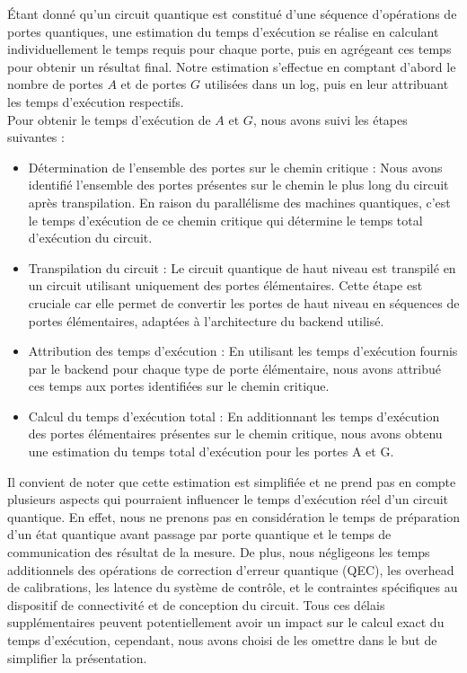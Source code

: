 Étant donné qu'un circuit quantique est constitué d'une séquence d'opérations de portes quantiques, une estimation du temps d'exécution se réalise en calculant individuellement le temps requis pour chaque porte, puis en agrégeant ces temps pour obtenir un résultat final.
Notre estimation s'effectue en comptant d'abord le nombre de portes $A$ et de portes $G$ utilisées dans un log, puis en leur attribuant les temps d'exécution respectifs.
\\
Pour obtenir le temps d'exécution de $A$ et $G$, nous avons suivi les étapes suivantes :
\begin{itemize}
    \item 
    Détermination de l'ensemble des portes sur le chemin critique : Nous avons identifié l'ensemble des portes présentes sur le chemin le plus long du circuit après transpilation. En raison du parallélisme des machines quantiques, c'est le temps d'exécution de ce chemin critique qui détermine le temps total d'exécution du circuit.
    \item
    Transpilation du circuit : Le circuit quantique de haut niveau est transpilé en un circuit utilisant uniquement des portes élémentaires. Cette étape est cruciale car elle permet de convertir les portes de haut niveau en séquences de portes élémentaires, adaptées à l'architecture du backend utilisé.
    \item
    Attribution des temps d'exécution : En utilisant les temps d'exécution fournis par le backend pour chaque type de porte élémentaire, nous avons attribué ces temps aux portes identifiées sur le chemin critique.
    \item
    Calcul du temps d'exécution total : En additionnant les temps d'exécution des portes élémentaires présentes sur le chemin critique, nous avons obtenu une estimation du temps total d'exécution pour les portes A et G.
\end{itemize}
Il convient de noter que cette estimation est simplifiée et ne prend pas en compte plusieurs aspects qui pourraient influencer le temps d'exécution réel d'un circuit quantique. 
En effet, nous ne prenons pas en considération le temps de préparation d'un état quantique avant passage par porte quantique et le temps de communication des résultat de la mesure. De plus, nous négligeons les temps additionnels des opérations de correction d'erreur quantique (QEC), les overhead de calibrations, les latence du système de contrôle, et le contraintes spécifiques au dispositif de  connectivité et de conception du circuit. 
Tous ces délais supplémentaires peuvent potentiellement avoir un impact sur le calcul exact du temps d'exécution, cependant, nous avons choisi de les omettre dans le but de simplifier la présentation.

